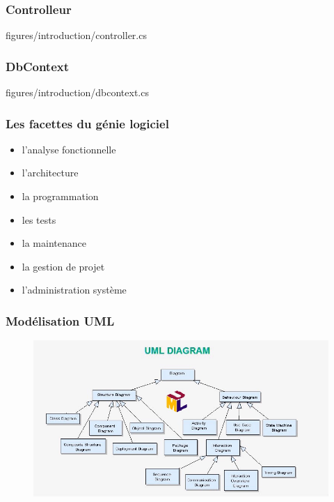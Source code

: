\begin{frame}
    \frametitle{Controlleur}

    
    {figures/introduction/controller.cs}
\end{frame}


\begin{frame}
    \frametitle{DbContext}

    
    {figures/introduction/dbcontext.cs}
\end{frame}

\begin{frame}
    \frametitle{Les facettes du génie logiciel}

    \begin{itemize}
        \item l'analyse fonctionnelle
        \item l'architecture
        \item la programmation
        \item les tests
        \item la maintenance
        \item la gestion de projet
        \item l'administration système
    \end{itemize}
\end{frame}

\begin{frame}
    \frametitle{Modélisation UML}

    \begin{figure}
        \centering
        \includegraphics[height=0.5\linewidth]{figures/introduction/uml}
        \label{fig:uml}
    \end{figure}
\end{frame}


